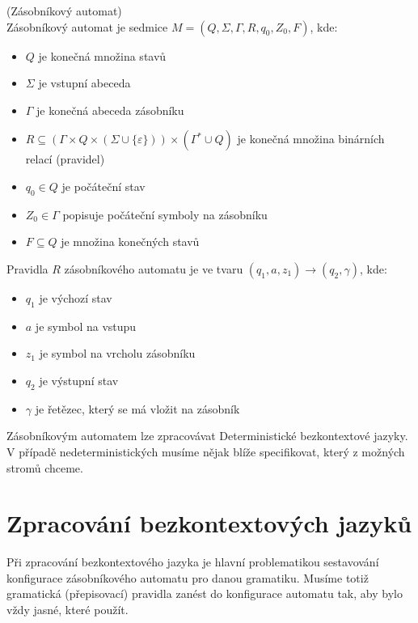 \begin{defn}
  (Zásobníkový automat)\\
  Zásobníkový automat je sedmice $M = (Q, \Sigma, \Gamma, R, q_0, Z_0, F)$, kde:
  \begin{itemize}
    \item $Q$ je konečná množina stavů
    \item $\Sigma$ je vstupní abeceda
    \item $\Gamma$ je konečná abeceda zásobníku
    \item $R \subseteq (\Gamma \times Q \times (\Sigma \cup \{\varepsilon\} ))
    \times (\Gamma^* \cup Q)$ je konečná množina binárních relací (pravidel)
    \item $q_0 \in Q$ je počáteční stav
    \item $Z_0 \in \Gamma$ popisuje počáteční symboly na zásobníku
    \item $F \subseteq Q$ je množina konečných stavů
  \end{itemize}

  \noindent
  Pravidla $R$ zásobníkového automatu je ve tvaru $(q_1, a, z_1) \rightarrow (q_2, \gamma)$, kde:

  \begin{itemize}
    \item $q_1$ je výchozí stav
    \item $a$ je symbol na vstupu
    \item $z_1$ je symbol na vrcholu zásobníku
    \item $q_2$ je výstupní stav
    \item $\gamma$ je řetězec, který se má vložit na zásobník
  \end{itemize}
  \vspace{-0.5cm}
\end{defn}

Zásobníkovým automatem lze zpracovávat Deterministické bezkontextové jazyky.
V případě nedeterministických musíme nějak blíže specifikovat, který z možných
stromů chceme.\\

\section{Zpracování bezkontextových jazyků}
\label{sec:CFLanguagesProcessing}

Při zpracování bezkontextového jazyka je hlavní problematikou
sestavování konfigurace zásobníkového automatu pro danou gramatiku.
Musíme totiž gramatická (přepisovací) pravidla zanést do konfigurace
automatu tak, aby bylo vždy jasné, které použít.\\

